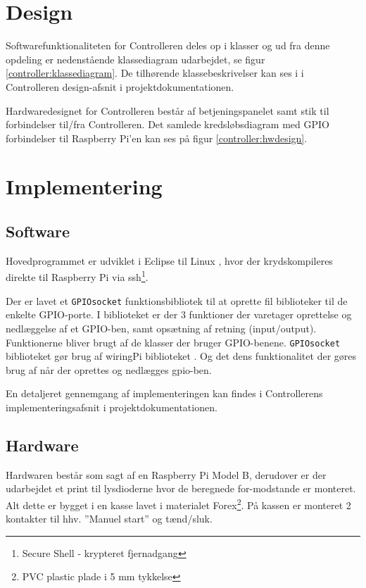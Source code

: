 \section{Design}
\label{ctrl_design}

Softwarefunktionaliteten for Controlleren deles op i klasser og ud fra denne opdeling er nedenstående klassediagram udarbejdet, se figur \ref{controller:klassediagram}. De tilhørende klassebeskrivelser kan ses i i Controlleren design-afsnit i projektdokumentationen.


Hardwaredesignet for Controlleren består af betjeningspanelet samt stik til forbindelser til/fra Controlleren. Det samlede kredsløbsdiagram med GPIO forbindelser til Raspberry Pi'en kan ses på figur \ref{controller:hwdesign}.


\section{Implementering}
\label{ctrl_implementering}

\subsection*{Software}

Hovedprogrammet er udviklet i Eclipse til Linux \citep{website:eclipsekepler}, hvor der krydskompileres direkte til Raspberry Pi via ssh\footnote{Secure Shell - krypteret fjernadgang}.

Der er lavet et \verb+GPIOsocket+ funktionsbibliotek til at oprette fil biblioteker til de enkelte GPIO-porte. I biblioteket er der 3 funktioner der varetager oprettelse og nedlæggelse af et GPIO-ben, samt opsætning af retning (input/output). Funktionerne bliver brugt af de klasser der bruger GPIO-benene. \verb+GPIOsocket+ biblioteket gør brug af wiringPi biblioteket \citep{website:wiringpi}. Og det dens funktionalitet der gøres brug af når der oprettes og nedlægges gpio-ben.

En detaljeret gennemgang af implementeringen kan findes i Controllerens implementeringsafsnit i projektdokumentationen.

\subsection*{Hardware}

Hardwaren består som sagt af en Raspberry Pi Model B, derudover er der udarbejdet et print til lysdioderne hvor de beregnede for-modstande er monteret. Alt dette er bygget i en kasse lavet i materialet Forex\footnote{PVC plastic plade i 5 mm tykkelse}. På kassen er monteret 2 kontakter til hhv. ''Manuel start'' og tænd/sluk.


